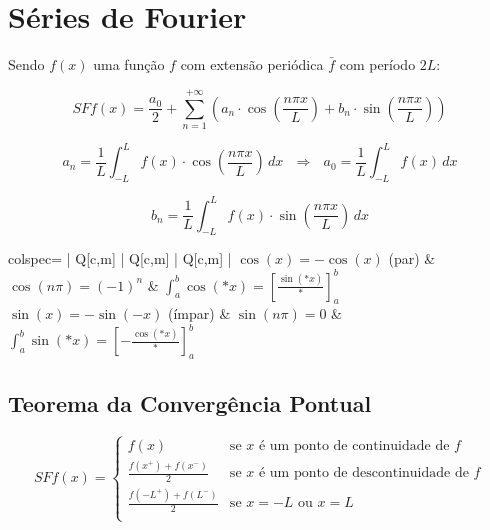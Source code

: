\documentclass[11pt, a4paper]{article}
\begin{document}
\newpage

\section{Séries de Fourier}

Sendo $f(x)$ uma função $f$ com extensão periódica $\bar{f}$ com período $2L$:

\begin{equation*}
    SFf(x) = \frac{a_0}{2} + \sum_{n=1}^{+\infty}
    \left(
    a_n \cdot \cos\left(\frac{n\pi x}{L}\right) +
    b_n \cdot \sin\left(\frac{n\pi x}{L}\right)
    \right)
\end{equation*}

\begin{equation*}
    a_n =
    \frac{1}{L} \int_{-L}^{L} f(x) \cdot \cos\left(\frac{n\pi x}{L}\right) \, dx
    \ \ \ \Rightarrow \ \ \
    a_0 =
    \frac{1}{L} \int_{-L}^{L} f(x) \, dx
\end{equation*}

\begin{equation*}
    b_n =
    \frac{1}{L} \int_{-L}^{L} f(x) \cdot \sin\left(\frac{n\pi x}{L}\right) \, dx
\end{equation*}

\begin{center}
    \begin{tblr}[T]{colspec={ | Q[c,m] | Q[c,m] | Q[c,m] | }}
        \hline
        $\cos(x) = - \cos(x)$ (par)    &
        $\cos(n\pi) = (-1)^n$          &
        $\displaystyle \int_a^b \cos(*x) = \left[\frac{\sin(*x)}{*}\right]_a^b$ \\\hline
        $\sin(x) = - \sin(-x)$ (ímpar) &
        $\sin(n\pi) = 0$               &
        $\displaystyle \int_a^b \sin(*x) = \left[-\frac{\cos(*x)}{*}\right]_a^b$
        \\\hline
    \end{tblr}
\end{center}

\subsection{Teorema da Convergência Pontual}

\begin{equation*}
    SFf(x) =
    \begin{cases}
        f(x)                     & \text{se $x$ é um ponto de continuidade de $f$}    \\
        \frac{f(x^+)+f(x^-)}{2}  & \text{se $x$ é um ponto de descontinuidade de $f$} \\
        \frac{f(-L^+)+f(L^-)}{2} & \text{se $x = -L$ ou $x = L$}                      \\
    \end{cases}
\end{equation*}
\end{document}
